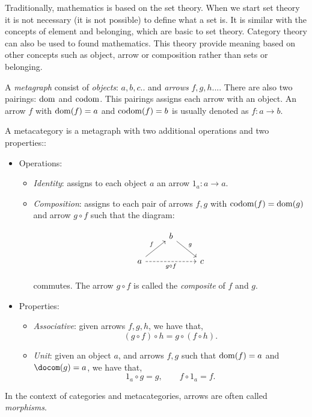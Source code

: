 Traditionally, mathematics is based on the set theory. When we start set theory it is not necessary (it is not possible) to define what a set is. It is similar with the concepts of element and belonging, which are basic to set theory. Category theory can also be used to found mathematics. This theory provide meaning based on other concepts such as object, arrow or composition rather than sets or belonging. \\

\begin{definition} \label{def:metagraph}
  A \emph{metagraph} consist of \emph{objects}: $a,b,c..$ and \emph{arrows} $f,g,h...$. There are also two pairings: $\operatorname{dom}$ and $\operatorname{codom}$. This pairings assigns each arrow with an object. An arrow $f$ with $\operatorname{dom}(f)=a$ and $\operatorname{codom}(f)=b$ is usually denoted as $f:a\to b$.\\
\end{definition}

\begin{definition}
  A metacategory  is a metagraph with two additional operations and two properties::
  \begin{itemize}
\item Operations:
    \begin{itemize}
     
  \item \emph{Identity}: assigns to each object $a$ an arrow $1_a:a\to a$. 
  \item \emph{Composition}: assigns to each pair of arrows $f,g$ with $\operatorname{codom}(f)=\operatorname{dom}(g)$ and arrow $g\circ f$ such that the diagram:

    \[
      \begin{tikzcd}
        & b \arrow[rd, "g"]& \\
        a\arrow[ru, "f"] \arrow[rr, "g\circ f",swap, dashed] && c
      \end{tikzcd}
    \]

    commutes. The arrow $g\circ f$ is called the \emph{composite} of $f$  and $g$.
  \end{itemize}

\item Properties:
  \begin{itemize}
  \item \emph{Associative}: given arrows $f,g,h$, we have that,
    $$(g\circ f) \circ h = g \circ (f \circ h).$$
  \item \emph{Unit}: given an object $a$, and arrows $f,g$ such that $\operatorname{dom} (f)= a$ and $\docom (g) = a$, we have that,
    $$1_a \circ g = g, \qquad f \circ 1_a = f.$$
  \end{itemize}
  \end{itemize}
In the context of categories and metacategories, arrows are often called \emph{morphisms}.
\end{definition}

